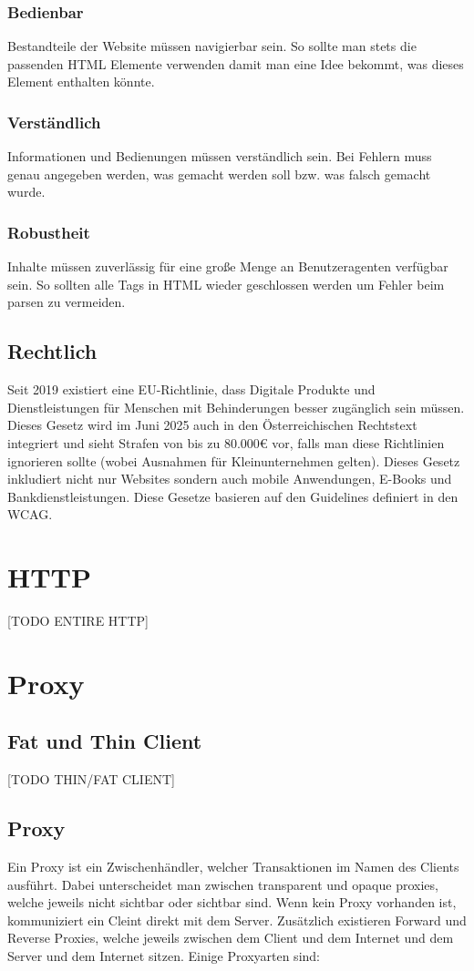 \documentclass{article}
\begin{document}
	\subsubsection{Bedienbar}
	Bestandteile der Website müssen navigierbar sein. So sollte man stets die passenden HTML Elemente verwenden damit man eine Idee bekommt, was dieses Element enthalten könnte.
	\subsubsection{Verständlich}
	Informationen und Bedienungen müssen verständlich sein. Bei Fehlern muss genau angegeben werden, was gemacht werden soll bzw. was falsch gemacht wurde.
	\subsubsection{Robustheit}
	Inhalte müssen zuverlässig für eine große Menge an Benutzeragenten verfügbar sein. So sollten alle Tags in HTML wieder geschlossen werden um Fehler beim parsen zu vermeiden.
	\subsection{Rechtlich}
	Seit 2019 existiert eine EU-Richtlinie, dass Digitale Produkte und Dienstleistungen für Menschen mit Behinderungen besser zugänglich sein müssen. Dieses Gesetz wird im Juni 2025 auch in den Österreichischen Rechtstext integriert und sieht Strafen von bis zu 80.000€ vor, falls man diese Richtlinien ignorieren sollte (wobei Ausnahmen für Kleinunternehmen gelten). Dieses Gesetz inkludiert nicht nur Websites sondern auch mobile Anwendungen, E-Books und Bankdienstleistungen. Diese Gesetze basieren auf den Guidelines definiert in den WCAG.
	\section{HTTP}
	[TODO ENTIRE HTTP]
	\section{Proxy}
	\subsection{Fat und Thin Client}
	[TODO THIN/FAT CLIENT]
	\subsection{Proxy}
	Ein Proxy ist ein Zwischenhändler, welcher Transaktionen im Namen des Clients ausführt. Dabei unterscheidet man zwischen transparent und opaque proxies, welche jeweils nicht sichtbar oder sichtbar sind. Wenn kein Proxy vorhanden ist, kommuniziert ein Cleint direkt mit dem Server. Zusätzlich existieren Forward und Reverse Proxies, welche jeweils zwischen dem Client und dem Internet und dem Server und dem Internet sitzen. Einige Proxyarten sind:
\end{document}
